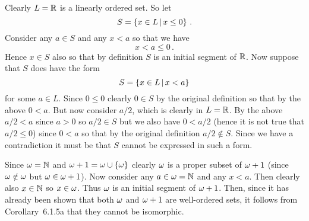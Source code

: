 
\begin{solution}
    Clearly $L = \mathbb{R}$ is a linearly ordered set.
    So let
    $$
    S = \left\{ x \in L \,|\, x \leq 0 \right\} \,.
    $$
    Consider any $a \in S$ and any $x < a$ so that we have
    $$
    x < a \leq 0 \,.
    $$
    Hence $x \in S$ also so that by definition $S$ is an initial segment of $\mathbb{R}$.
    Now suppose that $S$ does have the form
    $$
    S = \left\{ x \in L \,|\, x < a \right\}
    $$
    for some $a \in L$.
    Since $0 \leq 0$ clearly $0 \in S$ by the original definition so that by the above $0 < a$.
    But now consider $a/2$, which is clearly in $L = \mathbb{R}$.
    By the above $a/2 < a$ since $a > 0$ so $a/2 \in S$ but we also have $0 < a/2$ (hence it is not true that $a/2 \leq 0$) since $0 < a$ so that by the original definition $a/2 \notin S$.
    Since we have a contradiction it must be that $S$ cannot be expressed in such a form. \qedsymbol
\end{solution}


\begin{solution}
    Since $\omega = \mathbb{N}$ and $\omega + 1 = \omega \cup \left\{ \omega \right\}$ clearly $\omega$ is a proper subset of $\omega + 1$ (since $\omega \notin \omega$ but $\omega \in \omega + 1$).
    Now consider any $a \in \omega = \mathbb{N}$ and any $x < a$.
    Then clearly also $x \in \mathbb{N}$ so $x \in \omega$.
    Thus $\omega$ is an initial segment of $\omega + 1$.
    Then, since it has already been shown that both $\omega$ and $\omega + 1$ are well-ordered sets, it follows from Corollary~6.1.5a that they  cannot be isomorphic.
\end{solution}


